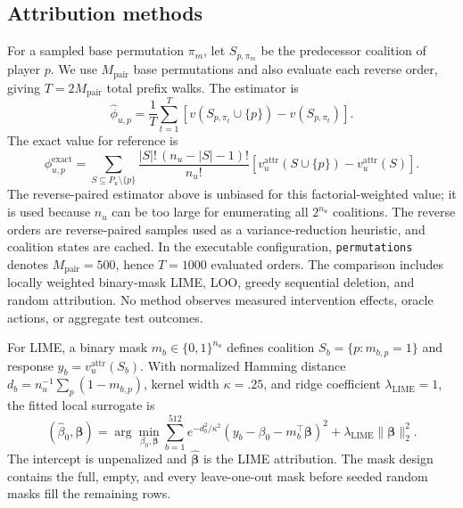 \documentclass[pdflatex,sn-mathphys-num]{sn-jnl}
\begin{document}
\subsection{Attribution methods}
For a sampled base permutation $\pi_m$, let $S_{p,\pi_m}$ be the predecessor coalition of player $p$. We use $M_{\mathrm{pair}}$ base permutations and also evaluate each reverse order, giving $T=2M_{\mathrm{pair}}$ total prefix walks. The estimator is
\begin{equation}
\widehat\phi_{u,p}=\frac{1}{T}\sum_{t=1}^{T}\left[v(S_{p,\pi_t}\cup\{p\})-v(S_{p,\pi_t})\right].
\end{equation}
The exact value for reference is
\begin{equation}
\phi^{\mathrm{exact}}_{u,p}=
\sum_{S\subseteq P_u\setminus\{p\}}
\frac{|S|!\,(n_u-|S|-1)!}{n_u!}
\left[v_u^{\mathrm{attr}}(S\cup\{p\})-v_u^{\mathrm{attr}}(S)\right].
\label{eq:exact-shapley}
\end{equation}
The reverse-paired estimator above is unbiased for this factorial-weighted value; it is used because $n_u$ can be too large for enumerating all $2^{n_u}$ coalitions. The reverse orders are reverse-paired samples used as a variance-reduction heuristic, and coalition states are cached. In the executable configuration, \texttt{permutations} denotes $M_{\mathrm{pair}}=500$, hence $T=1000$ evaluated orders. The comparison includes locally weighted binary-mask LIME, LOO, greedy sequential deletion, and random attribution. No method observes measured intervention effects, oracle actions, or aggregate test outcomes.

For LIME, a binary mask $m_b\in\{0,1\}^{n_u}$ defines coalition $S_b=\{p:m_{b,p}=1\}$ and response $y_b=v_u^{\mathrm{attr}}(S_b)$. With normalized Hamming distance $d_b=n_u^{-1}\sum_p(1-m_{b,p})$, kernel width $\kappa=.25$, and ridge coefficient $\lambda_{\mathrm{LIME}}=1$, the fitted local surrogate is
\begin{equation}
(\hat\beta_0,\hat{\boldsymbol\beta})=\arg\min_{\beta_0,\boldsymbol\beta}
\sum_{b=1}^{512}e^{-d_b^2/\kappa^2}\left(y_b-\beta_0-m_b^{\top}\boldsymbol\beta\right)^2
+\lambda_{\mathrm{LIME}}\lVert\boldsymbol\beta\rVert_2^2.
\label{eq:lime}
\end{equation}
The intercept is unpenalized and $\hat{\boldsymbol\beta}$ is the LIME attribution. The mask design contains the full, empty, and every leave-one-out mask before seeded random masks fill the remaining rows.
\end{document}
